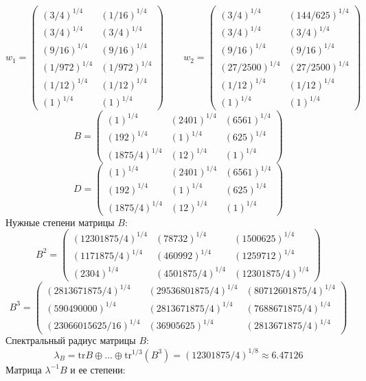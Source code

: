 $$w_1 = \begin{pmatrix}
(3/4)^{1/4} & (1/16)^{1/4}\\
(3/4)^{1/4} & (3/4)^{1/4}\\
(9/16)^{1/4} & (9/16)^{1/4}\\
(1/972)^{1/4} & (1/972)^{1/4}\\
(1/12)^{1/4} & (1/12)^{1/4}\\
(1)^{1/4} & (1)^{1/4}
\end{pmatrix}
\qquad w_2 = \begin{pmatrix}
(3/4)^{1/4} & (144/625)^{1/4}\\
(3/4)^{1/4} & (3/4)^{1/4}\\
(9/16)^{1/4} & (9/16)^{1/4}\\
(27/2500)^{1/4} & (27/2500)^{1/4}\\
(1/12)^{1/4} & (1/12)^{1/4}\\
(1)^{1/4} & (1)^{1/4}
\end{pmatrix}
$$
$$B = \begin{pmatrix}
(1)^{1/4} & (2401)^{1/4} & (6561)^{1/4}\\
(192)^{1/4} & (1)^{1/4} & (625)^{1/4}\\
(1875/4)^{1/4} & (12)^{1/4} & (1)^{1/4}
\end{pmatrix}
$$
$$D = \begin{pmatrix}
(1)^{1/4} & (2401)^{1/4} & (6561)^{1/4}\\
(192)^{1/4} & (1)^{1/4} & (625)^{1/4}\\
(1875/4)^{1/4} & (12)^{1/4} & (1)^{1/4}
\end{pmatrix}
$$
Нужные степени матрицы $B$:
$$B^2 = \begin{pmatrix}
(12301875/4)^{1/4} & (78732)^{1/4} & (1500625)^{1/4}\\
(1171875/4)^{1/4} & (460992)^{1/4} & (1259712)^{1/4}\\
(2304)^{1/4} & (4501875/4)^{1/4} & (12301875/4)^{1/4}
\end{pmatrix}
$$
$$B^3 = \begin{pmatrix}
(2813671875/4)^{1/4} & (29536801875/4)^{1/4} & (80712601875/4)^{1/4}\\
(590490000)^{1/4} & (2813671875/4)^{1/4} & (7688671875/4)^{1/4}\\
(23066015625/16)^{1/4} & (36905625)^{1/4} & (2813671875/4)^{1/4}
\end{pmatrix}
$$
Спектральный радиус матрицы $B$:
$$\lambda_{B} = \mathrm{tr}B\oplus \dots \oplus \mathrm{tr}^{1/3}(B^{3}) = (12301875/4)^{1/8} \approx 6.47126$$
Матрица $\lambda^{-1}B$ и ее степени:
